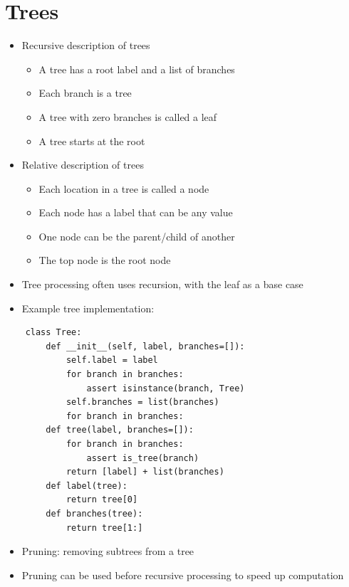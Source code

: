 \section{Trees}
\begin{itemize}
    \item Recursive description of trees
    \begin{itemize}
        \item A tree has a root label and a list of branches
        \item Each branch is a tree
        \item A tree with zero branches is called a leaf
        \item A tree starts at the root
    \end{itemize}
    \item Relative description of trees
    \begin{itemize}
        \item Each location in a tree is called a node
        \item Each node has a label that can be any value
        \item One node can be the parent/child of another
        \item The top node is the root node
    \end{itemize}
    \item Tree processing often uses recursion, with the leaf as a base case
    \item Example tree implementation:
\end{itemize}
\begin{verbatim}
    class Tree:
        def __init__(self, label, branches=[]):
            self.label = label
            for branch in branches:
                assert isinstance(branch, Tree)
            self.branches = list(branches)
            for branch in branches:
        def tree(label, branches=[]):
            for branch in branches:
                assert is_tree(branch)
            return [label] + list(branches)
        def label(tree):
            return tree[0]
        def branches(tree):
            return tree[1:]
\end{verbatim}
\begin{itemize}
    \item Pruning: removing subtrees from a tree
    \item Pruning can be used before recursive processing to speed up computation
\end{itemize}

